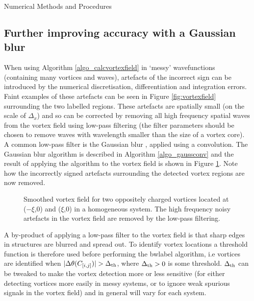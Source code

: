\begin{chapter}{\label{cha:numerics}Numerical Methods and Procedures}
\subsection{\label{section:gaussianblur} Further improving accuracy with a Gaussian blur}
When using Algorithm \ref{algo_calcvortexfield} in `messy' wavefunctions (containing many vortices and waves), artefacts of the incorrect sign can be introduced by the numerical discretisation, differentiation and integration errors. Faint examples of these artefacts can be seen in Figure \ref{fig:vortexfield} surrounding the two labelled regions. These artefacts are spatially small (on the scale of $\Delta_x$) and so can be corrected by removing all high frequency spatial waves from the vortex field using low-pass filtering (the filter parameters should be chosen to remove waves with wavelength smaller than the size of a vortex core). A common low-pass filter is the Gaussian blur \cite{shapiro2001computer}, applied using a convolution. The Gaussian blur algorithm is described in Algorithm \ref{algo_gaussconv} and the result of applying the algorithm to the vortex field is shown in Figure \ref{fig:vortexfieldsmooth}. Note how the incorrectly signed artefacts surrounding the detected vortex regions are now removed.
\begin{figure}[!ht]
  \centering
  \caption{Smoothed vortex field for two oppositely charged vortices located at ($-\xi$,0) and ($\xi$,0) in a homogeneous system. The high frequency noisy artefacts in the vortex field are removed by the low-pass filtering.\label{fig:vortexfieldsmooth} }
 \end{figure}

A by-product of applying a low-pass filter to the vortex field is that sharp edges in structures are blurred and spread out. To identify vortex locations a threshold function is therefore used before performing the bwlabel algorithm, i.e vortices are identified when $|\Delta\theta(C_{[i,j]})| > \Delta_{\rm th}$, where $\Delta_{\rm th}>0$ is some threshold. $\Delta_{\rm th}$ can be tweaked to make the vortex detection more or less sensitive (for either detecting vortices more easily in messy systems, or to ignore weak spurious signals in the vortex field) and in general will vary for each system.

\end{chapter}
